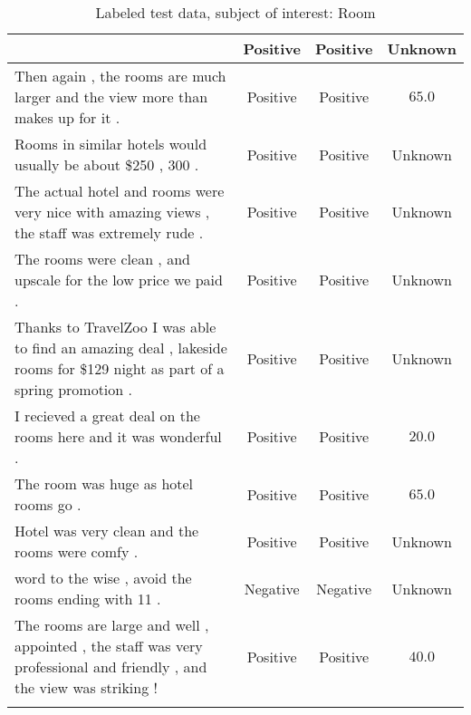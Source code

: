\begin{landscape}
\begin{center}
\begin{longtable}{m{9cm}ccc}
& Positive & Positive & Unknown \\ \hline
Then again , the rooms are much larger and the view more than makes up for it .
& Positive & Positive & $65.0$ \\ \hline
Rooms in similar hotels would usually be about \$250 , 300 .
& Positive & Positive & Unknown \\ \hline
The actual hotel and rooms were very nice with amazing views , the staff was extremely rude .
& Positive & Positive & Unknown \\ \hline
The rooms were clean , and upscale for the low price we paid .
& Positive & Positive & Unknown \\ \hline
Thanks to TravelZoo I was able to find an amazing deal , lakeside rooms for \$129 night as part of a spring promotion .
& Positive & Positive & Unknown \\ \hline
I recieved a great deal on the rooms here and it was wonderful .
& Positive & Positive & $20.0$ \\ \hline
The room was huge as hotel rooms go .
& Positive & Positive & $65.0$ \\ \hline
Hotel was very clean and the rooms were comfy .
& Positive & Positive & Unknown \\ \hline
word to the wise , avoid the rooms ending with 11 .
& Negative & Negative & Unknown \\ \hline
The rooms are large and well , appointed , the staff was very professional and friendly , and the view was striking ! 
& Positive & Positive & $40.0$\\
\caption{Labeled test data, subject of interest: Room}
\label{table:labeling}
\end{longtable}
\end{center}
\end{landscape}


